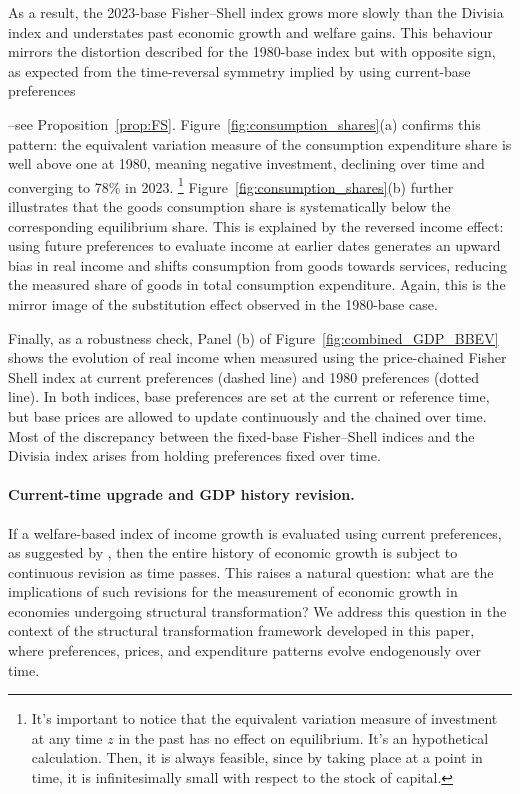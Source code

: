 \documentclass[12pt,a4paper]{article}
\begin{document}
As a result, the 2023-base Fisher--Shell index grows more slowly than the Divisia index and understates past economic growth and welfare gains.  
This behaviour mirrors the distortion described for the 1980-base index but with opposite sign, as expected from the time-reversal symmetry implied by using current-base preferences{--see Proposition~\ref{prop:FS}. 
Figure~\ref{fig:consumption_shares}(a) confirms this pattern:  
the equivalent variation measure of the consumption expenditure share is well above one at 1980, meaning negative investment, declining over time and converging to 78\% in 2023.%
\footnote{It's important to notice that the equivalent variation measure of investment at any time $z$ in the past has no effect on equilibrium. It's an hypothetical calculation. Then, it is always feasible, since by taking place at a point in time, it is infinitesimally small with respect to the stock of capital.}
Figure~\ref{fig:consumption_shares}(b) further illustrates that the goods consumption share is systematically below the corresponding equilibrium share. %
This is explained by the reversed income effect: using future preferences to evaluate income at earlier dates generates an upward bias in real income and shifts consumption from goods towards services, reducing the measured share of goods in total consumption expenditure.  
Again, this is the mirror image of the substitution effect observed in the 1980-base case.

Finally, as a robustness check, Panel (b) of Figure~\ref{fig:combined_GDP_BBEV} shows the evolution of real income when measured using the price-chained Fisher Shell index at current preferences (dashed line) and 1980 preferences (dotted line). In both indices, base preferences are set at the current or reference time, but base prices are allowed to update continuously and the chained over time. Most of the discrepancy between the fixed-base Fisher--Shell indices and the Divisia index arises from holding preferences fixed over time.  %


\paragraph{Current-time upgrade and GDP history revision.} 
If a welfare-based index of income growth is evaluated using current preferences, as suggested by \cite{BB2023welfare}, then the entire history of economic growth is subject to continuous revision as time passes.
This raises a natural question: what are the implications of such revisions for the measurement of economic growth in economies undergoing structural transformation?
We address this question in the context of the structural transformation framework developed in this paper, where preferences, prices, and expenditure patterns evolve endogenously over time.

}
\end{document}
